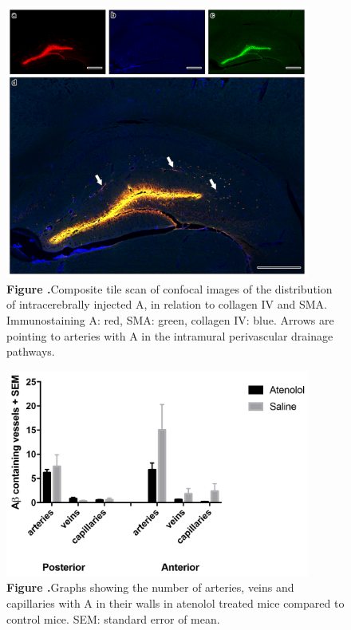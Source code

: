 \documentclass{frontiersFPHY} %
\newcommand{\Ab}{A\textbeta\xspace}
\begin{document}
\begin{figure}[h!]
\centering
\includegraphics[width=10cm]{figures/confocal.jpg}
\textbf{\label{fig:confocal} Figure .}{Composite tile scan of confocal images of the distribution of intracerebrally injected \Ab, in relation to collagen IV and SMA. Immunostaining \Ab: red, SMA: green, collagen IV: blue. Arrows are pointing to arteries with \Ab in the intramural perivascular drainage pathways.}
\end{figure}

\begin{figure}[h!]
\centering
\includegraphics[width=10cm]{figures/graph.png}
\textbf{\label{fig:graph} Figure .}{Graphs showing the number of arteries, veins and capillaries with \Ab in their walls in atenolol treated mice compared to control mice. SEM: standard error of mean.}
\end{figure}



\end{document}
